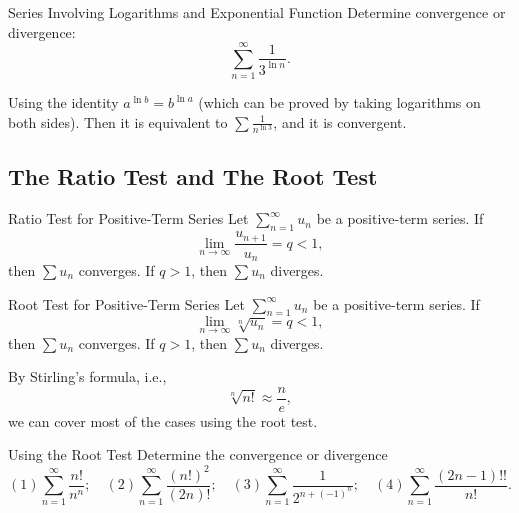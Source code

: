 \begin{example}{Series Involving Logarithms and Exponential Function}{}
  Determine convergence or divergence:
  \begin{equation}
    \sum\limits_{n = 1}^{\infty} \frac{1}{3^{\ln n}}.
  \end{equation}
\end{example}

\begin{solution}
  Using the identity $a^{\ln b} = b^{\ln a}$ (which can be proved by taking
  logarithms on both sides).
  Then it is equivalent to $\sum \frac{1}{n^{\ln 3}}$, and it is convergent.
\end{solution}

\subsection{The Ratio Test and The Root Test}

\begin{theorem}{Ratio Test for Positive-Term Series}{}
  Let $\sum\limits_{n = 1}^{\infty}u_n$ be a positive-term series.
  If
  \begin{equation}
    \lim \limits _{n \rightarrow \infty} \frac{u_{n+1}}{u_n} = q < 1,
  \end{equation}
  then $\sum u_n$ converges. If $q > 1$, then $\sum u_n$ diverges.
\end{theorem}

\begin{theorem}{Root Test for Positive-Term Series}{}
  Let $\sum\limits_{n = 1}^{\infty}u_n$ be a positive-term series.
  If
  \begin{equation}
    \lim \limits _{n \rightarrow \infty} \sqrt[n]{u_n} = q < 1,
  \end{equation}
  then $\sum u_n$ converges. If $q > 1$, then $\sum u_n$ diverges.
\end{theorem}

\begin{note}
  By Stirling's formula, i.e.,
  \begin{equation}
    \sqrt[n]{n!} \approx \frac{n}{e},
  \end{equation}
  we can cover most of the cases using the root test.
\end{note}

\begin{example}{Using the Root Test}{}
  Determine the convergence or divergence
  \begin{equation}
    (1) \sum\limits_{n = 1}^{\infty} \frac{n!}{n^n}; \quad
    (2) \sum\limits_{n = 1}^{\infty} \frac{(n!)^2}{(2n)!}; \quad
    (3) \sum\limits_{n = 1}^{\infty} \frac{1}{2^{n + (-1)^n}}; \quad
    (4) \sum\limits_{n = 1}^{\infty} \frac{(2n-1)!!}{n!}.
  \end{equation}
\end{example}


